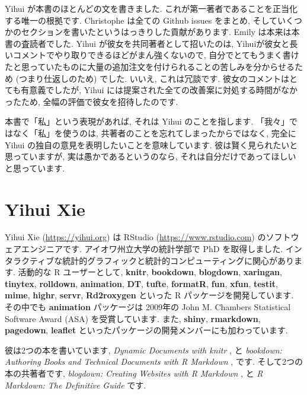 \documentclass[
  11pt,
  lualatex,
  ja=standard]{bxjsreport}
\begin{document}
Yihui が本書のほとんどの文を書きました. これが第一著者であることを正当化する唯一の根拠です. Christophe は全ての Github issues をまとめ, そしていくつかのセクションを書いたというはっきりした貢献があります. Emily は本来は本書の査読者でした. Yihui が彼女を共同著者として招いたのは, Yihuiが彼女と長いコメントでやり取りできるほどがまん強くないので, 自分でとてもうまく書けたと思っていたものに大量の追加注文を付けられることの苦しみを分からせるため (つまり仕返しのため) でした. いいえ, これは冗談です. 彼女のコメントはとても有意義でしたが, Yihui には提案された全ての改善案に対処する時間がなかったため, 全幅の評価で彼女を招待したのです.

本書で「私」という表現があれば, それは Yihui のことを指します. 「我々」ではなく「私」を使うのは, 共著者のことを忘れてしまったからではなく, 完全に Yihui の独自の意見を表明したいことを意味しています. 彼は賢く見られたいと思っていますが, 実は愚かであるというのなら, それは自分だけであってほしいと思っています.

\hypertarget{yihui-xie}{%
\section*{Yihui Xie}\label{yihui-xie}}

Yihui Xie (\url{https://yihui.org}) は RStudio (\url{https://www.rstudio.com}) のソフトウェアエンジニアです. アイオワ州立大学の統計学部で PhD を取得しました. インタラクティブな統計的グラフィックと統計的コンピューティングに関心があります. 活動的な R ユーザーとして, \textbf{knitr}, \textbf{bookdown}, \textbf{blogdown}, \textbf{xaringan}, \textbf{tinytex}, \textbf{rolldown}, \textbf{animation}, \textbf{DT}, \textbf{tufte}, \textbf{formatR}, \textbf{fun}, \textbf{xfun}, \textbf{testit}, \textbf{mime}, \textbf{highr}, \textbf{servr}, \textbf{Rd2roxygen} といった R パッケージを開発しています. その中でも \textbf{animation} パッケージは 2009年の John M. Chambers Statistical Software Award (ASA) を受賞しています. また, \textbf{shiny}, \textbf{rmarkdown}, \textbf{pagedown}, \textbf{leaflet} といったパッケージの開発メンバーにも加わっています.

彼は2つの本を書いています, \emph{Dynamic Documents with knitr} \autocite{knitr2015}, と \emph{bookdown: Authoring Books and Technical Documents with R Markdown} \autocite{bookdown2016}, です. そして2つの本の共著者です, \emph{blogdown: Creating Websites with R Markdown} \autocite{blogdown2017}, と \emph{R Markdown: The Definitive Guide} \autocite{rmarkdown2018} です.
\end{document}
